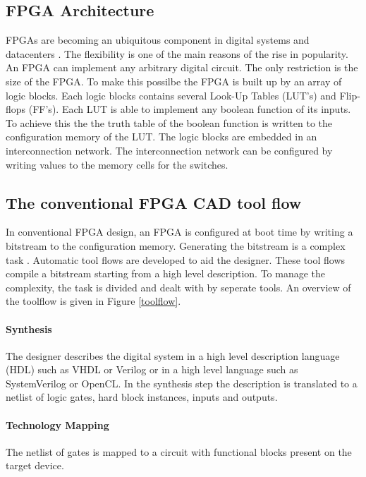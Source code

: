 \documentclass[a4paper,oneside,12pt]{article}
\begin{document}
\subsection{FPGA Architecture}
FPGAs are becoming an ubiquitous component in digital systems and datacenters \cite{ovtcharov2015accelerating,putnam2015reconfigurable}. The flexibility is one of the main reasons of the rise in popularity. An FPGA can implement any arbitrary digital circuit. The only restriction is the size of the FPGA. To make this possilbe the FPGA is built up by an array of logic blocks. Each logic blocks contains several Look-Up Tables (LUT's) and Flip-flops (FF's). Each LUT is able to implement any boolean function of its inputs. To achieve this the the truth table of the boolean function is written to the configuration memory of the LUT. The logic blocks are embedded in an interconnection network. The interconnection network can be configured by writing values to the memory cells for the switches.

\subsection{The conventional FPGA CAD tool flow}

In conventional FPGA design, an FPGA is configured at boot time by writing a bitstream to the configuration memory. Generating the bitstream is a complex task . 
Automatic tool flows are developed to aid the designer. These tool flows compile a bitstream starting from a high level description. To manage the complexity, the task is divided and dealt with by seperate tools. An overview of the toolflow is given in Figure \ref{toolflow}. 

\paragraph{Synthesis}
The designer describes the digital system in a high level description language (HDL) such as VHDL or Verilog or in a high level language such as SystemVerilog or OpenCL. In the synthesis step the description is translated to a netlist of logic gates, hard block instances, inputs and outputs.

\paragraph{Technology Mapping} 
The netlist of gates is mapped to a circuit with functional blocks present on the target device.
\end{document}
